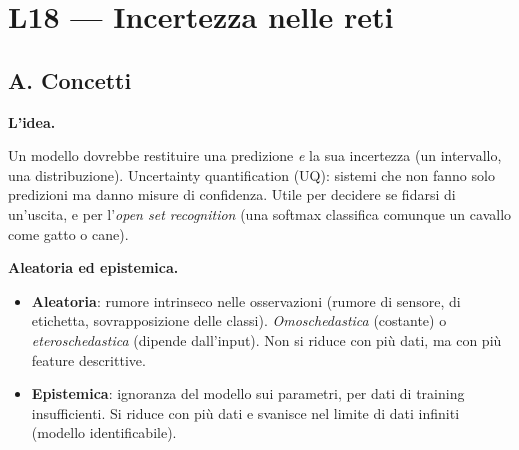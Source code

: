 \documentclass[11pt,a4paper]{article}
\newcommand{\dom}[1]{\par\smallskip\noindent\textbf{#1}\par\nopagebreak}
\begin{document}
\clearpage
\section{L18 --- Incertezza nelle reti}
\subsection*{A. Concetti}

\dom{L'idea.} Un modello dovrebbe restituire una predizione \emph{e} la sua incertezza (un intervallo, una distribuzione). Uncertainty quantification (UQ): sistemi che non fanno solo predizioni ma danno misure di confidenza. Utile per decidere se fidarsi di un'uscita, e per l'\emph{open set recognition} (una softmax classifica comunque un cavallo come gatto o cane).

\dom{Aleatoria ed epistemica.}
\begin{itemize}
\item \textbf{Aleatoria}: rumore intrinseco nelle osservazioni (rumore di sensore, di etichetta, sovrapposizione delle classi). \emph{Omoschedastica} (costante) o \emph{eteroschedastica} (dipende dall'input). Non si riduce con pi\`u dati, ma con pi\`u feature descrittive.
\item \textbf{Epistemica}: ignoranza del modello sui parametri, per dati di training insufficienti. Si riduce con pi\`u dati e svanisce nel limite di dati infiniti (modello identificabile).
\end{itemize}
\end{document}
